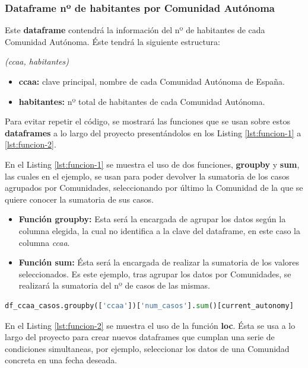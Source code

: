\subsubsection{Dataframe nº de habitantes por Comunidad Autónoma}

Este \textbf{dataframe} contendrá la información del nº de habitantes de cada Comunidad Autónoma. Éste tendrá la siguiente estructura:

\begin{center}
	\textit{(ccaa, habitantes)}
\end{center}

\begin{itemize}
	\item \textbf{ccaa:} clave principal, nombre de cada Comunidad Autónoma de España.
	\item \textbf{habitantes:} nº total de habitantes de cada Comunidad Autónoma.
\end{itemize}

Para evitar repetir el código, se mostrará las funciones que se usan sobre estos \textbf{dataframes} a lo largo del proyecto presentándolos en los Listing \ref{lst:funcion-1} a \ref{lst:funcion-2}.

En el Listing \ref{lst:funcion-1} se muestra el uso de dos funciones, \textbf{groupby} y \textbf{sum}, las cuales en el ejemplo, se usan para poder devolver la sumatoria de los casos agrupados por Comunidades, seleccionando por último la Comunidad de la que se quiere conocer la sumatoria de sus casos.

\begin{itemize}
	\item \textbf{Función groupby:} Esta será la encargada de agrupar los datos según la columna elegida, la cual no identifica a la clave del dataframe, en este caso la columna \textit{ccaa}. 
	\item \textbf{Función sum:} Ésta será la encargada de realizar la sumatoria de los valores seleccionados. Es este ejemplo, tras agrupar los datos por Comunidades, se realizará la sumatoria del nº de casos de las mismas.
\end{itemize}

\begin{lstlisting}[language=Python, caption={Funciones groupby y sum.}, label={lst:funcion-1}]
df_ccaa_casos.groupby(['ccaa'])['num_casos'].sum()[current_autonomy]
\end{lstlisting}

En el Listing \ref{lst:funcion-2} se muestra el uso de la función \textbf{loc}. Ésta se usa a lo largo del proyecto para crear nuevos dataframes que cumplan una serie de condiciones simultaneas, por ejemplo, seleccionar los datos de una Comunidad concreta en una fecha deseada.

